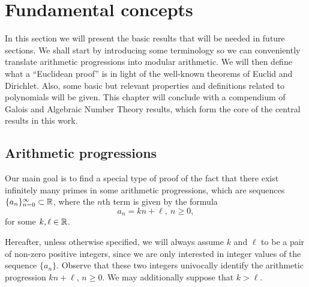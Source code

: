 \documentclass[../main.tex]{subfiles}
\begin{document}
\section{Fundamental concepts}\label{sec:fundamentals}
In this section we will present the basic results that will be needed in future sections. We shall start by introducing some terminology so we can conveniently translate arithmetic progressions into modular arithmetic. We will then define what a ``Euclidean proof'' is in light of the well-known theorems of Euclid and Dirichlet. Also, some basic but relevant properties and definitions related to polynomials will be given. This chapter will conclude with a compendium of Galois and Algebraic Number Theory results, which form the core of the central results in this work.

\subsection{Arithmetic progressions}
Our main goal is to find a special type of proof of the fact that there exist infinitely many primes in some arithmetic progressions, which are sequences $\{a_n\}_{n=0}^\infty\subset\mathbb{R}$, where the $n$th term is given by the formula 
	\begin{equation}\label{eq:arithprogression}
		a_n=kn+\ell, \ n\geqslant 0,
	\end{equation}
for some $k,\ell\in\mathbb{R}$.

Hereafter, unless otherwise specified, we will always assume $k$ and $\ell$ to be a pair of non-zero positive integers, since we are only interested in integer values of the sequence $\{a_n\}$. Observe that these two integers univocally identify the arithmetic progression $kn+\ell$, $n\geqslant 0$. We may additionally suppose that $k > \ell$.
\end{document}

